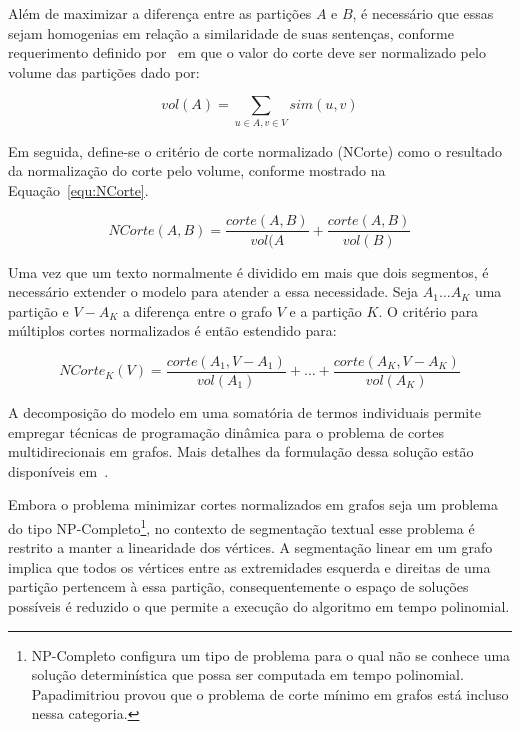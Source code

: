 Além de maximizar a diferença entre as partições $A$ e $B$, é necessário que essas sejam homogenias em relação a similaridade de suas sentenças, conforme requerimento definido por~\cite{Shi2000} em que o valor do corte deve ser normalizado pelo volume das partições dado por:

\begin{equation}
	vol(A) = \sum_{u \in A, v \in V} sim(u, v)
\end{equation}


Em seguida, define-se o critério de corte normalizado (NCorte) como o resultado da normalização do corte pelo volume, conforme mostrado na Equação~\ref{equ:NCorte}.

\begin{equation}
	NCorte(A,B) = \frac{corte(A,B)}{vol(A} + \frac{corte(A,B)}{vol(B)}
	\label{equ:NCorte}
\end{equation}


Uma vez que um texto normalmente é dividido em mais que dois segmentos, é necessário extender o modelo para atender a essa necessidade. Seja $A_1 \dots A_K$ uma partição e $V - A_K$ a diferença entre o grafo $V$ e a partição $K$. O critério para múltiplos cortes normalizados é então estendido para: 

\begin{equation} 
	NCorte_K(V) = \frac{corte(A_1, V-A_1)}{vol(A_1)} + \dots + \frac{corte(A_K, V-A_K)}{vol(A_K)} 
	\label{equ:NCorte-k}
\end{equation}


A decomposição do modelo em uma somatória de termos individuais permite empregar técnicas de programação dinâmica para o problema de cortes multidirecionais em grafos. Mais detalhes da formulação dessa solução estão disponíveis em~\cite{Malioutov:2006a}.

Embora o problema minimizar cortes normalizados em grafos seja um problema do tipo NP-Completo\footnote{NP-Completo configura um tipo de problema para o qual não se conhece uma solução determinística que possa ser computada em tempo polinomial. Papadimitriou provou que o problema de corte mínimo em grafos está incluso nessa categoria.}, no contexto de segmentação textual esse problema é restrito a manter a linearidade dos vértices. A segmentação linear em um grafo implica que todos os vértices entre as extremidades esquerda e direitas de uma partição pertencem à essa partição, consequentemente o espaço de soluções possíveis é reduzido o que permite a execução do algoritmo em tempo polinomial.  

















 
